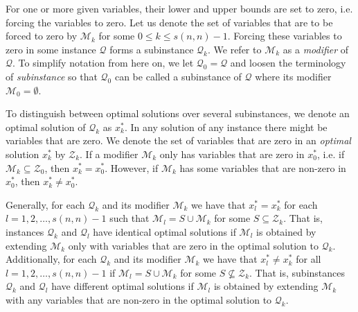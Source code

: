 For one or more given variables, their lower and upper bounds are set to zero,
i.e. forcing the variables to zero.
Let us denote the set of variables that are to be forced to zero by
$\mathcal{M}_k$ for some $0 \leq k \leq s(n, n) - 1$.
Forcing these variables to zero in some instance $\mathcal{Q}$ forms
a subinstance $\mathcal{Q}_k$. We refer to $\mathcal{M}_k$ as a
\emph{modifier} of $\mathcal{Q}$.
To simplify notation from here on, we let
$\mathcal{Q}_0 = \mathcal{Q}$ and loosen the terminology of
\emph{subinstance} so that $\mathcal{Q}_0$ can be called a subinstance of
$\mathcal{Q}$ where its modifier $\mathcal{M}_0 = \emptyset$.

To distinguish between optimal solutions over several subinstances, we denote
an optimal solution of $\mathcal{Q}_k$ as $x_k^*$.
In any solution of any instance there might be variables that are zero.
We denote the set of variables that are zero in an \emph{optimal} solution
$x_k^*$ by $\mathcal{Z}_k$.
If a modifier $\mathcal{M}_k$ only has variables that are zero in $x_0^*$,
i.e. if $\mathcal{M}_k \subseteq \mathcal{Z}_0$, then $x_k^* = x_0^*$. However,
if $\mathcal{M}_k$ has some variables that are non-zero in $x_0^*$, then
$x_k^* \neq x_0^*$.

Generally, for each $\mathcal{Q}_k$ and its modifier $\mathcal{M}_k$ we
have that $x_l^* = x_k^*$ for each $l=1,2,\ldots,s(n, n)-1$ such that
$\mathcal{M}_l = S \cup \mathcal{M}_k$ for some $S \subseteq \mathcal{Z}_k$.
That is, instances $\mathcal{Q}_k$ and $\mathcal{Q}_l$ have identical optimal
solutions if $\mathcal{M}_l$ is obtained by extending $\mathcal{M}_k$ only with
variables that are zero in the optimal solution to $\mathcal{Q}_k$.
Additionally, for each $\mathcal{Q}_k$ and its modifier $\mathcal{M}_k$ we
have that $x_l^* \neq x_k^*$ for all $l=1,2,\ldots,s(n, n)-1$ if
$\mathcal{M}_l = S \cup \mathcal{M}_k$ for some $S\not\subseteq \mathcal{Z}_k$.
That is, subinstances $\mathcal{Q}_k$ and $\mathcal{Q}_l$ have different
optimal solutions if $\mathcal{M}_l$ is obtained by extending $\mathcal{M}_k$
with any variables that are non-zero in the optimal solution to
$\mathcal{Q}_k$.
